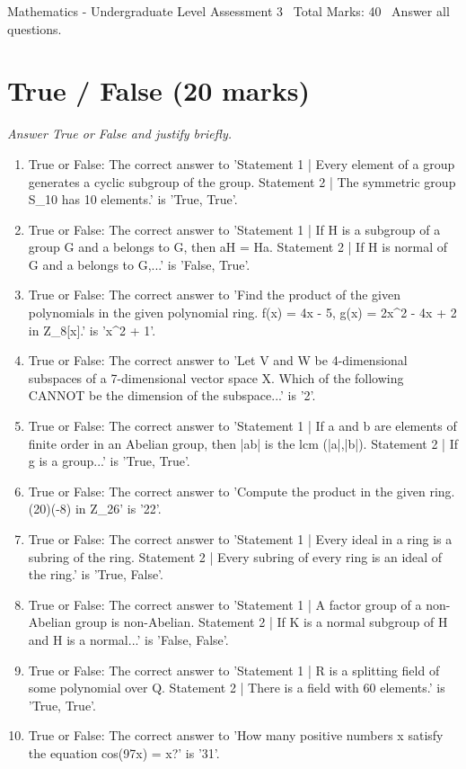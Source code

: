 \documentclass[12pt]{article}
\begin{document}
\begin{center}
Mathematics - Undergraduate Level Assessment 3 \
Total Marks: 40 \
Answer all questions.
\end{center}

\section*{True / False (20 marks)}
\textit{Answer True or False and justify briefly.}
\begin{enumerate}[label=\arabic*.]
\item True or False: The correct answer to 'Statement 1 | Every element of a group generates a cyclic subgroup of the group. Statement 2 | The symmetric group S\_10 has 10 elements.' is 'True, True'.
\item True or False: The correct answer to 'Statement 1 | If H is a subgroup of a group G and a belongs to G, then aH = Ha. Statement 2 | If H is normal of G and a belongs to G,...' is 'False, True'.
\item True or False: The correct answer to 'Find the product of the given polynomials in the given polynomial ring. f(x) = 4x - 5, g(x) = 2x\^{}2 - 4x + 2 in Z\_8[x].' is 'x\^{}2 + 1'.
\item True or False: The correct answer to 'Let V and W be 4-dimensional subspaces of a 7-dimensional vector space X. Which of the following CANNOT be the dimension of the subspace...' is '2'.
\item True or False: The correct answer to 'Statement 1 | If a and b are elements of finite order in an Abelian group, then |ab| is the lcm (|a|,|b|). Statement 2 | If g is a group...' is 'True, True'.
\item True or False: The correct answer to 'Compute the product in the given ring. (20)(-8) in Z\_26' is '22'.
\item True or False: The correct answer to 'Statement 1 | Every ideal in a ring is a subring of the ring. Statement 2 | Every subring of every ring is an ideal of the ring.' is 'True, False'.
\item True or False: The correct answer to 'Statement 1 | A factor group of a non-Abelian group is non-Abelian. Statement 2 | If K is a normal subgroup of H and H is a normal...' is 'False, False'.
\item True or False: The correct answer to 'Statement 1 | R is a splitting field of some polynomial over Q. Statement 2 | There is a field with 60 elements.' is 'True, True'.
\item True or False: The correct answer to 'How many positive numbers x satisfy the equation cos(97x) = x?' is '31'.
\end{enumerate}
\end{document}
